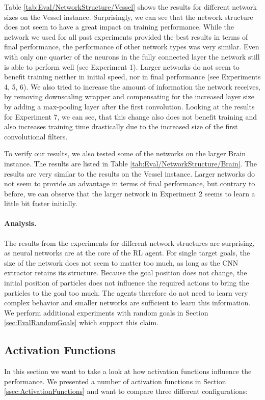 Table \ref{tab:Eval/NetworkStructure/Vessel} shows the results for different network sizes on the Vessel instance. Surprisingly, we can see that the network structure does not seem to have a great impact on training performance. While the network we used for all past experiments provided the best results in terms of final performance, the performance of other network types was very similar. Even with only one quarter of the neurons in the fully connected layer the network still is able to perform well (see Experiment 1). Larger networks do not seem to benefit training neither in initial speed, nor in final performance (see Experiments 4, 5, 6). We also tried to increase the amount of information the network receives, by removing downscaling wrapper and compensating for the increased layer size by adding a max-pooling layer after the first convolution. Looking at the results for Experiment 7, we can see, that this change also does not benefit training and also increases training time drastically due to the increased size of the first convolutional filters. 

To verify our results, we also tested some of the networks on the larger Brain instance. The results are listed in Table \ref{tab:Eval/NetworkStructure/Brain}. The results are very similar to the results on the Vessel instance. Larger networks do not seem to provide an advantage in terms of final performance, but contrary to before, we can observe that the larger network in Experiment 2 seems to learn a little bit faster initially. 

\paragraph{Analysis. } The results from the experiments for different network structures are surprising, as neural networks are at the core of the RL agent. For single target goals, the size of the network does not seem to matter too much, as long as the CNN extractor retains its structure. Because the goal position does not change, the initial position of particles does not influence the required actions to bring the particles to the goal too much. The agents therefore do not need to learn very complex behavior and smaller networks are sufficient to learn this information. We perform additional experiments with random goals in Section \ref{sec:EvalRandomGoals} which support this claim.

\subsection{Activation Functions} \label{sec:Eval/ActivationFunctions}
In this section we want to take a look at how activation functions influence the performance. We presented a number of activation functions in Section \ref{ssec:ActivationFunctions} and want to compare three different configurations: 

